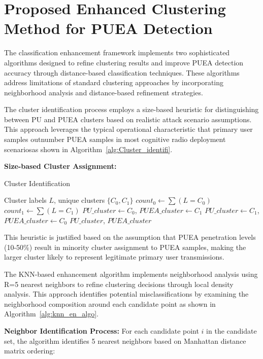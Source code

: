 \section{Proposed Enhanced Clustering Method for PUEA
Detection}

The classification enhancement framework implements two sophisticated algorithms designed to refine clustering results and improve PUEA detection accuracy through distance-based classification techniques. These algorithms address limitations of standard clustering approaches by incorporating neighborhood analysis and distance-based refinement strategies.


The cluster identification process employs a size-based heuristic for distinguishing between PU and PUEA clusters based on realistic attack scenario assumptions. This approach leverages the typical operational characteristic that primary user samples outnumber PUEA samples in most cognitive radio deployment scenariosas shown in Algorithm~\ref{alg:Cluster_identifi}.

\textbf{Size-based Cluster Assignment:}
\begin{algorithm}
\caption{Cluster Identification}
\label{alg:Cluster_identifi}
\begin{algorithmic}[1]
\REQUIRE Cluster labels $L$, unique clusters $\{C_0, C_1\}$
\STATE $count_0 \leftarrow \sum(L = C_0)$
\STATE $count_1 \leftarrow \sum(L = C_1)$
    \STATE $PU\_cluster \leftarrow C_0$, $PUEA\_cluster \leftarrow C_1$
\ELSE
    \STATE $PU\_cluster \leftarrow C_1$, $PUEA\_cluster \leftarrow C_0$
\ENDIF
\RETURN $PU\_cluster$, $PUEA\_cluster$
\end{algorithmic}
\end{algorithm}

This heuristic is justified based on the assumption that PUEA penetration levels (10-50\%) result in minority cluster assignment to PUEA samples, making the larger cluster likely to represent legitimate primary user transmissions.

The KNN-based enhancement algorithm implements neighborhood analysis using R=5 nearest neighbors to refine clustering decisions through local density analysis. This approach identifies potential misclassifications by examining the neighborhood composition around each candidate point as shown in Algorithm~\ref{alg:knn_en_algo}.

\textbf{Neighbor Identification Process:}
For each candidate point $i$ in the candidate set, the algorithm identifies 5 nearest neighbors based on Manhattan distance matrix ordering:

